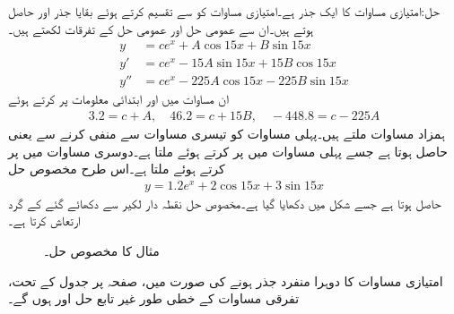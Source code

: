 حل:امتیازی مساوات  کا ایک جذر  ہے۔امتیازی مساوات کو  سے تقسیم کرتے ہوئے بقایا جذر  اور  حاصل ہوتے ہیں۔ان سے عمومی حل اور عمومی حل کے تفرقات لکھتے ہیں۔
\begin{align*}
y&=ce^{x}+A\cos 15x+B\sin 15x\\
y'&=ce^{x}-15A\sin 15x+15B\cos 15x\\
y''&=ce^{x}-225A\cos 15x-225B\sin 15x
\end{align*} 
ان مساوات میں  اور ابتدائی معلومات پر کرتے ہوئے
\begin{align*}
3.2=c+A,\quad 46.2=c+15B, \quad -448.8=c-225A
\end{align*}
ہمزاد مساوات ملتے ہیں۔پہلی مساوات کو تیسری مساوات سے منفی کرنے سے  یعنی  حاصل ہوتا ہے جسے پہلی مساوات میں پر کرتے ہوئے  ملتا ہے۔دوسری مساوات میں  پر کرتے ہوئے  ملتا ہے۔اس طرح مخصوص حل
\begin{align*}
y=1.2e^x+2\cos 15x+3\sin 15x
\end{align*}
حاصل ہوتا ہے جسے شکل  میں دکھایا گیا ہے۔مخصوص حل نقطہ دار لکیر سے دکھائے گئے  کے گرد ارتعاش کرتا ہے۔
%
\begin{figure}
\centering
{}
\caption{مثال  کا مخصوص حل۔}
\label{شکل_مثال_سادہ_بلند_منفرد_مخلوط_جذر}
\end{figure}

امتیازی مساوات کا دوہرا منفرد جذر  ہونے کی صورت میں، صفحہ  پر  جدول  کے تحت، تفرقی مساوات کے خطی طور غیر تابع حل  اور   ہوں گے۔ 

